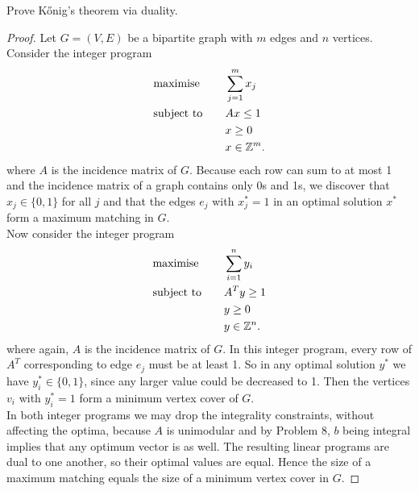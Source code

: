 \documentclass[12pt]{article}
\newcommand{\Z}{\mathbb{Z}}
\newenvironment{problem}[2][Problem]{\begin{trivlist}
\item[\hskip \labelsep {\bfseries #1}\hskip \labelsep {\bfseries #2.}]}{\end{trivlist}}
\theoremstyle{plain}
\begin{document}
\begin{problem}{6}
    Prove K\H{o}nig's theorem via duality.
\end{problem}
\begin{proof}
    Let $G=(V,E)$ be a bipartite graph with $m$ edges and $n$ vertices. Consider the integer program
    \begin{alignat*}{2}
        & \textup{maximise} & \quad & \sum_{j=1}^m x_j\\
        & \textup{subject to} & & Ax \leq 1\\
        &  & & x\geq 0\\
        &  & & x\in \Z^m.
    \end{alignat*}
    where $A$ is the incidence matrix of $G$. Because each row can sum to at most 1 and the incidence matrix of a graph contains only 0s and 1s, we discover that $x_j\in \{0,1\}$ for all $j$ and that the edges $e_j$ with $x^*_j = 1$ in an optimal solution $x^*$ form a maximum matching in $G$.\\
    \indent Now consider the integer program
    \begin{alignat*}{2}
        & \textup{maximise} & \quad & \sum_{i=1}^n y_i\\
        & \textup{subject to} & & A^Ty \geq 1\\
        &  & & y\geq 0\\
        &  & & y\in \Z^n.
    \end{alignat*}
    where again, $A$ is the incidence matrix of $G$. In this integer program, every row of $A^T$ corresponding to edge $e_j$ must be at least 1. So in any optimal solution $y^*$ we have $y^*_i\in \{0,1\}$, since any larger value could be decreased to 1. Then the vertices $v_i$ with $y^*_i = 1$ form a minimum vertex cover of $G$.\\
    \indent In both integer programs we may drop the integrality constraints, without affecting the optima, because $A$ is unimodular and by Problem 8, $b$ being integral implies that any optimum vector is as well. The resulting linear programs are dual to one another, so their optimal values are equal. Hence the size of a maximum matching equals the size of a minimum vertex cover in $G$.
\end{proof}
\end{document}
